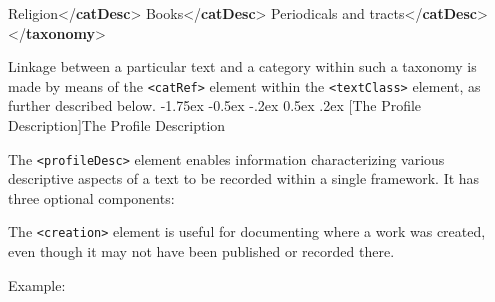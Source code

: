 \documentclass[11pt,twoside]{article}\makeatletter
\makeatletter
\renewcommand\section{\@startsection {section}{1}{\z@}%
     {-1.75ex \@plus -0.5ex \@minus -.2ex}%
     {0.5ex \@plus .2ex}%
     {\reset@font\Large\bfseries\sffamily}}
\renewcommand\subsection{\@startsection{subsection}{2}{\z@}%
     {-1.75ex\@plus -0.5ex \@minus- .2ex}%
     {0.5ex \@plus .2ex}%
     {\reset@font\Large\sffamily}}
\def\DivII{\subsection}
\def\DivII{\section}
\makeatother
\begin{document}
\begin{shaded}
\hspace*{1em}Religion{</\textbf{catDesc}>}\mbox{}\newline 
\hspace*{1em}\mbox{}\newline 
\hspace*{1em}\hspace*{1em}Books{</\textbf{catDesc}>}\mbox{}\newline 
\hspace*{1em}\mbox{}\newline 
\hspace*{1em}\mbox{}\newline 
\hspace*{1em}\hspace*{1em}Periodicals and tracts{</\textbf{catDesc}>}\mbox{}\newline 
\hspace*{1em}\mbox{}\newline 
{}\mbox{}\newline 
{</\textbf{taxonomy}>}\end{shaded}\egroup\par \par Linkage between a particular text and a category within such a
taxonomy is made by means of the \texttt{<catRef>} element within the
\texttt{<textClass>} element, as further described
       below.
\DivII[The Profile Description]{The Profile Description}\par The \texttt{<profileDesc>} element enables information
characterizing various descriptive aspects of a text to be recorded
within a single framework. It has three optional components:
\par The \texttt{<creation>} element is useful for documenting where a
work was created, even though it may not have been published or
recorded there.\par Example:
\end{document}
